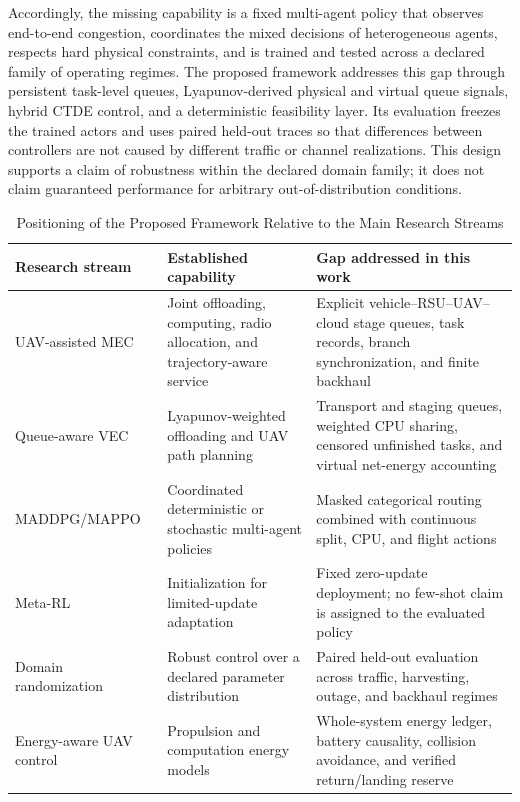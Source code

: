 Accordingly, the missing capability is a fixed multi-agent policy that observes
end-to-end congestion, coordinates the mixed decisions of heterogeneous
agents, respects hard physical constraints, and is trained and tested across a
declared family of operating regimes. The proposed framework addresses this
gap through persistent task-level queues, Lyapunov-derived physical and virtual
queue signals, hybrid CTDE control, and a deterministic feasibility layer. Its
evaluation freezes the trained actors and uses paired held-out traces so that
differences between controllers are not caused by different traffic or channel
realizations. This design supports a claim of robustness within the declared
domain family; it does not claim guaranteed performance for arbitrary
out-of-distribution conditions.

\begin{table}[!t]
\caption{Positioning of the Proposed Framework Relative to the Main Research Streams}
\label{tab:positioning}
\centering
\footnotesize
\begin{tabular}{p{}p{}p{}}
\toprule
Research stream & Established capability & Gap addressed in this work\\
\midrule
UAV-assisted MEC~\cite{liu2020uav,xiong2021energy,guo2024multi} & Joint offloading, computing, radio allocation, and trajectory-aware service & Explicit vehicle--RSU--UAV--cloud stage queues, task records, branch synchronization, and finite backhaul\\
Queue-aware VEC~\cite{neely2010stochastic,mao2017dynamic,sun2026qtop} & Lyapunov-weighted offloading and UAV path planning & Transport and staging queues, weighted CPU sharing, censored unfinished tasks, and virtual net-energy accounting\\
MADDPG/MAPPO~\cite{lowe2017multi,schulman2017proximal,talukdar2026mappo} & Coordinated deterministic or stochastic multi-agent policies & Masked categorical routing combined with continuous split, CPU, and flight actions\\
Meta-RL~\cite{finn2017model,nichol2018reptile,yan2026rmaddpg} & Initialization for limited-update adaptation & Fixed zero-update deployment; no few-shot claim is assigned to the evaluated policy\\
Domain randomization~\cite{tobin2017domain,peng2018sim} & Robust control over a declared parameter distribution & Paired held-out evaluation across traffic, harvesting, outage, and backhaul regimes\\
Energy-aware UAV control~\cite{liu2020uav,talukdar2026mappo,zhang2019predictive} & Propulsion and computation energy models & Whole-system energy ledger, battery causality, collision avoidance, and verified return/landing reserve\\
\bottomrule
\end{tabular}
\end{table}
